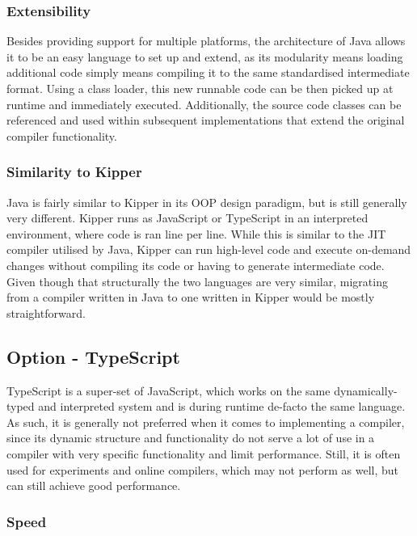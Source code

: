 \subsubsection{Extensibility}

Besides providing support for multiple platforms, the architecture of Java allows it to be an easy language to set up and extend, as its modularity means loading additional code simply means compiling it to the same standardised intermediate format. Using a class loader, this new runnable code can be then picked up at runtime and immediately executed. Additionally, the source code classes can be referenced and used within subsequent implementations that extend the original compiler functionality.

\subsubsection{Similarity to Kipper}

Java is fairly similar to Kipper in its OOP design paradigm, but is still generally very different. Kipper runs as JavaScript or TypeScript in an interpreted environment, where code is ran line per line. While this is similar to the JIT compiler utilised by Java, Kipper can run high-level code and execute on-demand changes without compiling its code or having to generate intermediate code. Given though that structurally the two languages are very similar, migrating from a compiler written in Java to one written in Kipper would be mostly straightforward.

\subsection{Option - TypeScript}
\label{sec:programming-language-option-typescript}

TypeScript is a super-set of JavaScript, which works on the same dynamically-typed and interpreted system and is during runtime de-facto the same language. As such, it is generally not preferred when it comes to implementing a compiler, since its dynamic structure and functionality do not serve a lot of use in a compiler with very specific functionality and limit performance. Still, it is often used for experiments and online compilers, which may not perform as well, but can still achieve good performance.

\subsubsection{Speed}

